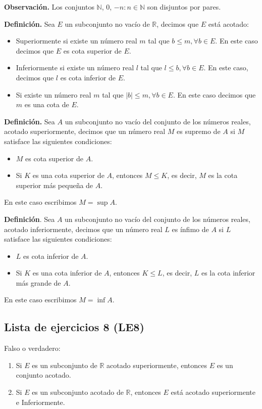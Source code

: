 \documentclass[11pt]{article}
\newcommand{\N}{\mathbb{N}}
\newcommand{\R}{\mathbb{R}}
\begin{document}
\textbf{Observación.} Los conjuntos $\N$, ${0}$, ${-n: n\in \N}$ son disjuntos por pares.

\textbf{Definición.} Sea $E$ un subconjunto no vacío de $\R$, decimos que $E$ está acotado: \begin{itemize}
    \item Superiormente si existe un número real $m$ tal que $b \leq m, \forall b\in E$. En este caso decimos que $E$ es cota superior de $E$.
    \item Inferiormente si existe un número real $l$ tal que $l \leq b, \forall b\in E$. En este caso, decimos que $l$ es cota inferior de $E$.
    \item Si existe un número real $m$ tal que $|b|\leq m,\forall b \in E$. En este caso decimos que $m$ es una cota de $E$.
\end{itemize}

\textbf{Definición.} Sea $A$ un subconjunto no vacío del conjunto de los números reales, acotado superiormente, decimos que un número real $M$ es supremo de $A$ si $M$ satisface las siguientes condiciones: \begin{itemize}
    \item $M$ es cota superior de $A$.
    \item Si $K$ es una cota superior de $A$, entonces $M\leq K$, es decir, $M$ es la cota superior más pequeña de $A$.
\end{itemize}

En este caso escribimos $M=\sup{A}$.

\textbf{Definición}. Sea $A$ un subconjunto no vacío del conjunto de los números reales, acotado inferiormente, decimos que un número real $L$ es ínfimo de $A$ si $L$ satisface las siguientes condiciones: \begin{itemize}
    \item $L$ es cota inferior de $A$.
    \item Si $K$ es una cota inferior de $A$, entonces $K\leq L$, es decir, $L$ es la cota inferior más grande de $A$.
\end{itemize}

En este caso escribimos $M=\inf{A}$.

\pagebreak

\subsection*{Lista de ejercicios 8 (LE8)}

Falso o verdadero: \begin{enumerate}[label=\arabic*.]
    \item Si $E$ es un subconjunto de $\R$ acotado superiormente, entonces $E$ es un conjunto acotado.
    \item Si $E$ es un subconjunto acotado de $\R$, entonces $E$ está acotado superiormente e Inferiormente.
\end{enumerate}
\end{document}
